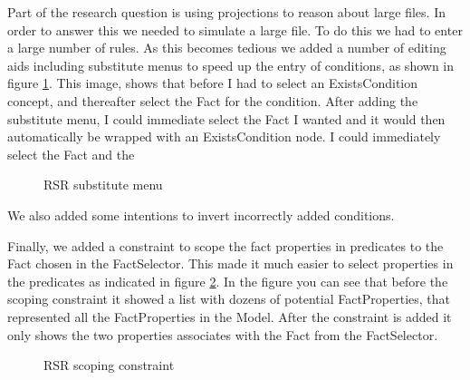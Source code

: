 Part of the research question is using projections to reason about large files.
In order to answer this we needed to simulate a large file.
To do this we had to enter a large number of rules.
As this becomes tedious we added a number of editing aids including substitute menus to speed up the entry of conditions, as shown in figure \ref{fig:RSRSubstituteMenu}.
This image, shows that before I had to select an ExistsCondition concept, and thereafter select the Fact for the condition.
After adding the substitute menu, I could immediate select the Fact I wanted and it would then automatically be wrapped with an ExistsCondition node.
I could immediately select the Fact and the 

\begin{figure}[h]
    \centering
    \caption{RSR substitute menu}
    \label{fig:RSRSubstituteMenu}
\end{figure}

We also added some intentions to invert incorrectly added conditions.

Finally, we added a constraint to scope the fact properties in predicates to the Fact chosen in the FactSelector.
This made it much easier to select properties in the predicates as indicated in figure \ref{fig:RSRConstraint}.
In the figure you can see that before the scoping constraint it showed a list with dozens of potential FactProperties, that represented all the FactProperties in the Model.
After the constraint is added it only shows the two properties associates with the Fact from the FactSelector.

\begin{figure}[h]
    \centering
    \caption{RSR scoping constraint}
    \label{fig:RSRConstraint}
\end{figure}

